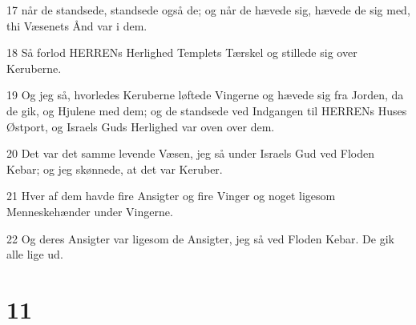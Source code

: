 \par 17 når de standsede, standsede også de; og når de hævede sig, hævede de sig med, thi Væsenets Ånd var i dem.
\par 18 Så forlod HERRENs Herlighed Templets Tærskel og stillede sig over Keruberne.
\par 19 Og jeg så, hvorledes Keruberne løftede Vingerne og hævede sig fra Jorden, da de gik, og Hjulene med dem; og de standsede ved Indgangen til HERRENs Huses Østport, og Israels Guds Herlighed var oven over dem.
\par 20 Det var det samme levende Væsen, jeg så under Israels Gud ved Floden Kebar; og jeg skønnede, at det var Keruber.
\par 21 Hver af dem havde fire Ansigter og fire Vinger og noget ligesom Menneskehænder under Vingerne.
\par 22 Og deres Ansigter var ligesom de Ansigter, jeg så ved Floden Kebar. De gik alle lige ud.

\chapter{11}

